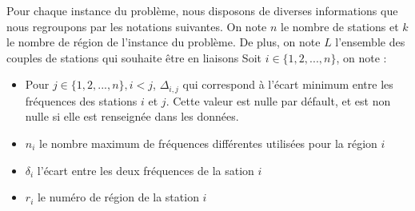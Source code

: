 \documentclass[a4paper, 10pt]{article}
\begin{document}
      Pour chaque instance du problème, nous disposons de diverses informations que nous regroupons par les notations suivantes.
      On note $n$ le nombre de stations et $k$ le nombre de région de l'instance du problème. De plus, on note $L$ l'ensemble des couples de stations qui souhaite être en liaisons
      Soit $i \in \{1,2,...,n \}$, on note :
      \begin{itemize}
        \item Pour $ j \in \{1,2,...,n \}, i<j$, $\Delta_{i,j}$ qui correspond à l'écart minimum entre les fréquences des stations $i$ et $j$. Cette valeur est nulle par défault, et est non nulle si elle est renseignée dans les données.
        \item $n_{i}$ le nombre maximum de fréquences différentes utilisées pour la région $i$
        \item $\delta_{i}$ l'écart entre les deux fréquences de la sation $i$
        \item $r_{i}$ le numéro de région de la station $i$
      \end{itemize}
\end{document}
